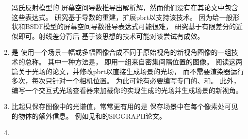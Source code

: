 \begin{enumerate}
            冯氏反射模型的
            屏幕空间导数推导出解析解，然而他们没有在其论文中包含这些表达式。
            研究基于导数的重建，扩展pbrt以支持该技术。
            因为给一般形状和BSDF模型的屏幕空间导数推导表达式可能很难，
            研究基于有限差分的近似即可。射线差分背后
            基于该思想的技术可能对该尝试有成效。
      \item \circlethree {}是
            使用一个场景一幅或多幅图像合成不同于原始视角的新视角图像的一组技术的总称。
            其中一种方法是，
            即用一组来自密集间隔位置的图像\citep{10.1145/237170.237199,10.1145/237170.237200}。
            阅读这两篇关于光场的论文，并修改pbrt以直接生成场景的光场，
            而不需要渲染器运行多次，每次只针对一个相机位置。
            为此可能有必要编写专门的、和。
            此外，编写一个交互式光场查看器来加载你的实现生成的光场并生成场景的新视角。
      \item \circlethree 比起只保存图像中的光谱值，常常更有用的是
            保存场景中在每个像素处可见的物体的额外信息。
            例如见\citet{10.1145/325334.325247}和\citet{10.1145/97879.97901}的SIGGRAPH论文。
      \item
\end{enumerate}